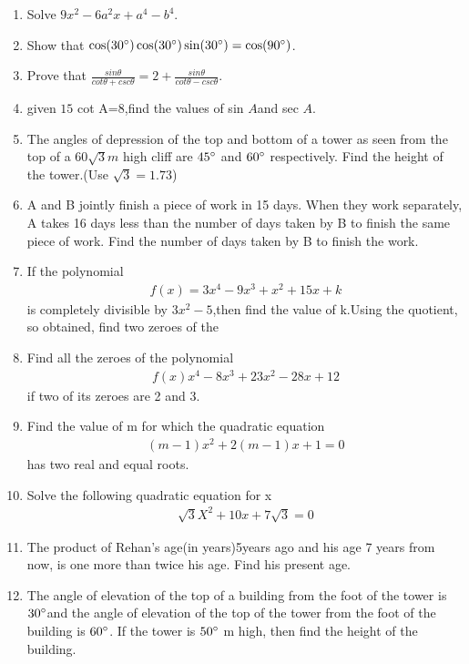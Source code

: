 \documentclass{article}
\begin{document}
\begin{enumerate}
\item Solve $9x^2-6a^2x+a^4-b^4$.

\item Show that $\cos(30\degree) \cos(30\degree) \sin(30\degree)=\cos(90\degree)$.

\item Prove that $\frac{sin\theta}{cot\theta+csc\theta}=2+\frac{sin\theta}{cot\theta-csc\theta}$.
\item given $15$ cot A=8,find the values of sin $A$and sec $A$.  
\item The angles of depression of the top and bottom of a tower as seen from the top of a $60\sqrt{3}m$ high cliff are $45\degree$ and $60\degree$ respectively. Find the height of the tower.(Use $\sqrt{3}=1.73$)
\item A and B jointly finish a piece of work in 15 days. When they work 
separately, A takes 16 days less than the number of days taken by B to 
finish the same piece of work. Find the number of days taken by B to 
finish the work.
\item If the polynomial \begin{align} 
f(x)=3x^4-9x^3+x^2+15x+k
\end{align} is completely divisible by $3x^2-5$,then find the value of k.Using the quotient, so obtained, find two zeroes of the 
\item Find all the zeroes of the polynomial \begin{align}
    f(x)x^4-8x^3+23x^2-28x+12
\end{align} if two of its zeroes are 2 and 3.  
    \item Find the value of m for which the quadratic equation
    \begin{align}
                      (m-1)x^2+2(m-1)x+1=0
                  \end{align} has two real and equal roots. 
                  \item Solve the following quadratic equation for x 
                  \begin{align}
                      \sqrt{3}X^2+10x+7\sqrt{3}=0
                  \end{align}
                  \item  The product of Rehan's age(in years)5years ago and his age 7 years from now, is one more than twice his age. Find his present age.
                  \item The angle of elevation of the top of a building from the foot of the tower is $30\degree$and the angle of elevation of the top of the tower from the foot of the building is $60\degree$. If the tower is $50\degree$ m high, then find the height of the building.

\end{enumerate}
\end{document}
